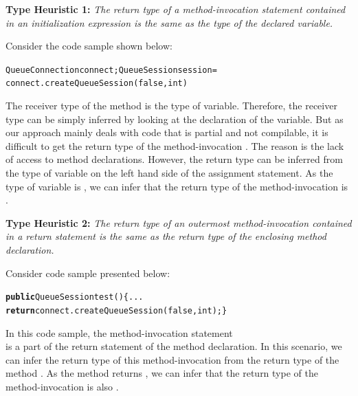 \textbf{Type Heuristic 1:} \emph{The return type of a
method-invocation statement contained in an initialization
expression is the same as the type of the declared variable.}

Consider the code sample shown below:
\begin{CodeOut}
\begin{alltt}
QueueConnection connect; QueueSession session =
\hspace*{0.4in}connect.createQueueSession(false,int)
\end{alltt}
\end{CodeOut}

The receiver type of the method
 is the type of 
variable. Therefore, the receiver type can be simply inferred by
looking at the declaration of the  variable. But as
our approach mainly deals with code that is partial and not
compilable, it is difficult to get the return type of the
method-invocation  . The reason is the
lack of access to method declarations. However, the return type can
be inferred from the type of variable  on the left
hand side of the assignment statement. As the type of variable
 is , we can infer that the
return type of the method-invocation  is
.

\textbf{Type Heuristic 2:} \emph{The return type of an outermost
method-invocation contained in a return statement is the same as the
return type of the enclosing method declaration.}

Consider code sample presented below:
\begin{CodeOut}
\begin{alltt}
\textbf{public} QueueSession test()\hspace*{0.2in}\{ ...
\hspace*{0.4in}\textbf{return} connect.createQueueSession(false,int);\}
\end{alltt}
\end{CodeOut}

In this code sample, the method-invocation statement\\
 is a part of the return statement of the
method declaration. In this scenario, we can infer the return type of
this method-invocation from the return type of the method .
As the method  returns , we
can infer that the return type of the
method-invocation  is also
.

